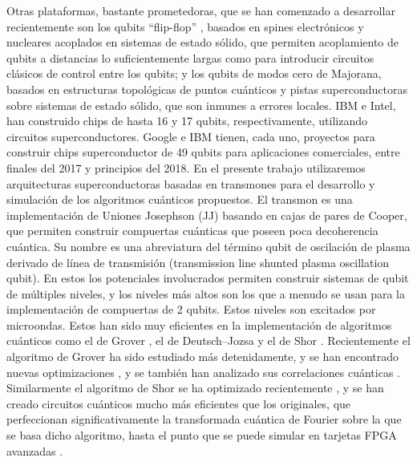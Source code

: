 Otras plataformas, bastante prometedoras, que se han comenzado a desarrollar recientemente son los qubits ``flip-flop'' \cite{Rotta_2017, Tosi_2017, Harris_2016, Koch_2007}, basados en spines electrónicos y nucleares acoplados en sistemas de estado sólido, que permiten acoplamiento de qubits a distancias lo suficientemente largas como para introducir circuitos clásicos de control entre los qubits; y los qubits de modos cero de Majorana, basados en estructuras topológicas de puntos cuánticos y pistas superconductoras sobre sistemas de estado sólido, que son inmunes a errores locales. IBM e Intel, han construido chips de hasta 16 y 17 qubits, respectivamente, utilizando circuitos superconductores. Google e IBM tienen, cada uno, proyectos para construir chips superconductor de 49 qubits para aplicaciones comerciales, entre finales del 2017 y principios del 2018.  En el presente trabajo utilizaremos arquitecturas superconductoras basadas en transmones para el desarrollo y simulación de los algoritmos cuánticos propuestos. El transmon \cite{Koch_2007} es una implementación de Uniones Josephson (JJ) basando en cajas de pares de Cooper, que permiten construir compuertas cuánticas que poseen poca decoherencia cuántica. Su nombre es una abreviatura del término qubit de oscilación de plasma derivado de línea de transmisión (transmission line shunted plasma oscillation qubit). En estos los potenciales involucrados permiten construir sistemas de qubit de múltiples niveles, y los niveles más altos son los que a menudo se usan para la implementación de compuertas de 2 qubits. Estos niveles son excitados por microondas. Estos han sido muy eficientes en la implementación de algoritmos cuánticos como el de Grover \cite{Grover_1996, Dewes_2012, Said_2017, DiCarlo_2009}, el de Deutsch–Jozsa \cite{DiCarlo_2009, Deutsch_1992, Zhao_2016} y el de Shor \cite{Shor_1999, Gambetta_2017, Monz_2016}.  Recientemente el algoritmo de Grover ha sido estudiado más detenidamente, y se han encontrado nuevas optimizaciones \cite{Chakrabarty_2017}, y se también han analizado sus correlaciones cuánticas \cite{Gubaidullina_2016, Ye_2016}. Similarmente el algoritmo de Shor se ha optimizado recientemente \cite{Dridi_2017, Johansson_2017}, y se han creado circuitos cuánticos mucho más eficientes que los originales, que perfeccionan significativamente la transformada cuántica de Fourier sobre la que se basa dicho algoritmo, hasta el punto que se puede simular en tarjetas FPGA avanzadas \cite{Lee_2016}.

